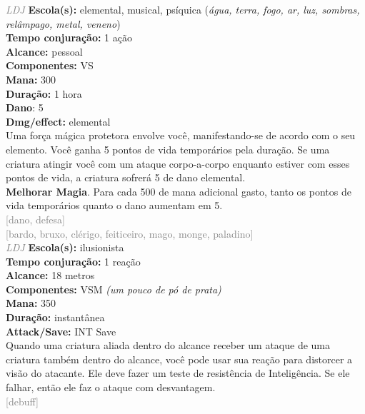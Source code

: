 \documentclass{RPG_Adventure}[2021/10/20]
\begin{document}
{\tiny \textcolor{gray}{\textit{LDJ}}}
{\small \t \textbf{Escola(s):} elemental, musical, psíquica (\textit{água, terra, fogo, ar, luz, sombras, relâmpago, metal, veneno})\\\t \textbf{Tempo conjuração:} 1 ação\\\t \textbf{Alcance:} pessoal\\\t \textbf{Componentes:} VS\\\t \textbf{Mana:} 300\\\t \textbf{Duração:} 1 hora\\\t \textbf{Dano}: 5\\\t \textbf{Dmg/effect:} elemental\\}
{\normalsize Uma força mágica protetora envolve você, manifestando-se de acordo com o seu elemento. Você ganha 5 pontos de vida temporários pela duração. Se uma criatura atingir você com um ataque corpo-a-corpo enquanto estiver com esses pontos de vida, a criatura sofrerá 5 de dano elemental.\\\t \textbf{Melhorar Magia}. Para cada 500 de mana adicional gasto, tanto os pontos de vida temporários quanto o dano aumentam em 5.\\}
{\scriptsize \textcolor{gray}{[dano, defesa]\\}}
{\scriptsize \textcolor{gray}{[bardo, bruxo, clérigo, feiticeiro, mago, monge, paladino]\\}}
{\tiny \textcolor{gray}{\textit{LDJ}}}
{\small \t \textbf{Escola(s):} ilusionista\\\t \textbf{Tempo conjuração:} 1 reação\\\t \textbf{Alcance:} 18 metros\\\t \textbf{Componentes:} VSM \textit{(um pouco de pó de prata)}\\\t \textbf{Mana:} 350\\\t \textbf{Duração:} instantânea\\\t \textbf{Attack/Save:} INT Save\\}
{\normalsize Quando uma criatura aliada dentro do alcance receber um ataque de uma criatura também dentro do alcance, você pode usar sua reação para distorcer a visão do atacante. Ele deve fazer um teste de resistência de Inteligência. Se ele falhar, então ele faz o ataque com desvantagem.\\}
{\scriptsize \textcolor{gray}{[debuff]\\}}
\end{document}
